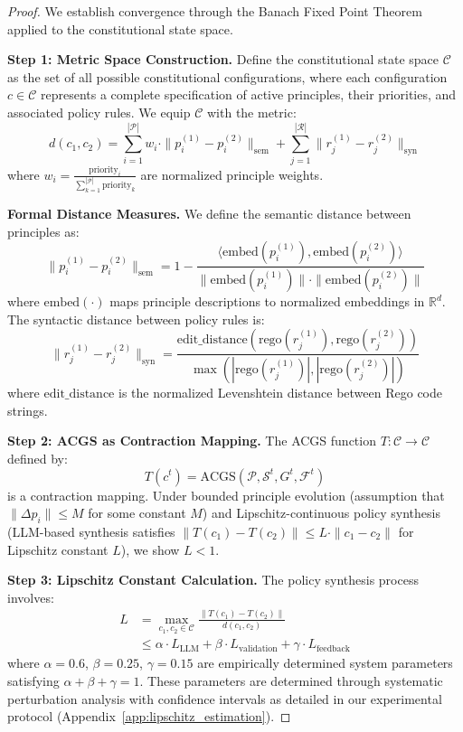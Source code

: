\documentclass[sigconf,natbib]{acmart}
\begin{document}
\begin{proof}
We establish convergence through the Banach Fixed Point Theorem applied to the constitutional state space.

\textbf{Step 1: Metric Space Construction.} Define the constitutional state space $\mathcal{C}$ as the set of all possible constitutional configurations, where each configuration $c \in \mathcal{C}$ represents a complete specification of active principles, their priorities, and associated policy rules. We equip $\mathcal{C}$ with the metric:
$$d(c_1, c_2) = \sum_{i=1}^{|\mathcal{P}|} w_i \cdot \|p_i^{(1)} - p_i^{(2)}\|_{\text{sem}} + \sum_{j=1}^{|\mathcal{R}|} \|r_j^{(1)} - r_j^{(2)}\|_{\text{syn}}$$
where $w_i = \frac{\text{priority}_i}{\sum_{k=1}^{|\mathcal{P}|} \text{priority}_k}$ are normalized principle weights.

\textbf{Formal Distance Measures.} We define the semantic distance between principles as:
$$\|p_i^{(1)} - p_i^{(2)}\|_{\text{sem}} = 1 - \frac{\langle \text{embed}(p_i^{(1)}), \text{embed}(p_i^{(2)}) \rangle}{\|\text{embed}(p_i^{(1)})\| \cdot \|\text{embed}(p_i^{(2)})\|}$$
where $\text{embed}(\cdot)$ maps principle descriptions to normalized embeddings in $\mathbb{R}^d$. The syntactic distance between policy rules is:
$$\|r_j^{(1)} - r_j^{(2)}\|_{\text{syn}} = \frac{\text{edit\_distance}(\text{rego}(r_j^{(1)}), \text{rego}(r_j^{(2)}))}{\max(|\text{rego}(r_j^{(1)})|, |\text{rego}(r_j^{(2)})|)}$$
where $\text{edit\_distance}$ is the normalized Levenshtein distance between Rego code strings.

\textbf{Step 2: ACGS as Contraction Mapping.} The ACGS function $T: \mathcal{C} \rightarrow \mathcal{C}$ defined by:
$$T(c^t) = \text{ACGS}(\mathcal{P}, \mathcal{S}^t, G^t, \mathcal{F}^t)$$
is a contraction mapping. Under bounded principle evolution (assumption that $\|\Delta p_i\| \leq M$ for some constant $M$) and Lipschitz-continuous policy synthesis (LLM-based synthesis satisfies $\|T(c_1) - T(c_2)\| \leq L \cdot \|c_1 - c_2\|$ for Lipschitz constant $L$), we show $L < 1$.

\textbf{Step 3: Lipschitz Constant Calculation.} The policy synthesis process involves:
\begin{align}
L &= \max_{c_1, c_2 \in \mathcal{C}} \frac{\|T(c_1) - T(c_2)\|}{d(c_1, c_2)} \\
&\leq \alpha \cdot L_{\text{LLM}} + \beta \cdot L_{\text{validation}} + \gamma \cdot L_{\text{feedback}}
\end{align}
where $\alpha = 0.6$, $\beta = 0.25$, $\gamma = 0.15$ are empirically determined system parameters satisfying $\alpha + \beta + \gamma = 1$. These parameters are determined through systematic perturbation analysis with confidence intervals as detailed in our experimental protocol (Appendix~\ref{app:lipschitz_estimation}).


\end{proof}
\end{document}
